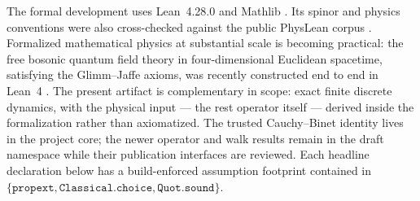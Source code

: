 \documentclass[11pt]{article}
\begin{document}
The formal development uses Lean~4.28.0 and Mathlib \cite{Lean4,Mathlib}.  Its
spinor and physics conventions were also cross-checked against the public
PhysLean corpus \cite{PhysLean}.  Formalized mathematical physics at
substantial scale is becoming practical: the free bosonic quantum field
theory in four-dimensional Euclidean spacetime, satisfying the Glimm--Jaffe
axioms, was recently constructed end to end in Lean~4
\cite{DouglasQFTLean}.  The present artifact is complementary in scope:
exact finite discrete dynamics, with the physical input --- the rest
operator itself --- derived inside the formalization rather than
axiomatized.  The trusted
Cauchy--Binet identity lives in the project core; the newer operator and walk
results remain in the draft namespace while their publication interfaces are
reviewed.  Each headline declaration below has a build-enforced assumption
footprint contained in
$\{\mathtt{propext},\mathtt{Classical.choice},\mathtt{Quot.sound}\}$.
\end{document}
